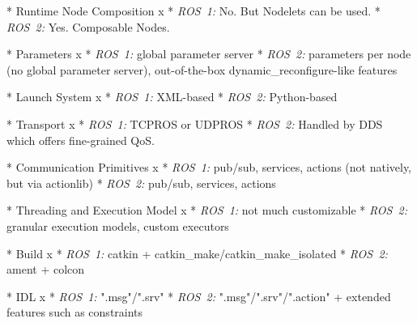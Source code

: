* Runtime Node Composition
\begitems \style x
* {\em ROS~1:} No. But Nodelets can be used.
* {\em ROS~2:} Yes. Composable Nodes.
\enditems

* Parameters
\begitems \style x
* {\em ROS~1:} global parameter server
* {\em ROS~2:} parameters per node (no global parameter server), out-of-the-box dynamic_reconfigure-like features
\enditems

* Launch System
\begitems \style x
* {\em ROS~1:} XML-based
* {\em ROS~2:} Python-based
\enditems

* Transport
\begitems \style x
* {\em ROS~1:} TCPROS or UDPROS
* {\em ROS~2:} Handled by DDS which offers fine-grained QoS.
\enditems

* Communication Primitives
\begitems \style x
* {\em ROS~1:} pub/sub, services, actions (not natively, but via actionlib)
* {\em ROS~2:} pub/sub, services, actions
\enditems

* Threading and Execution Model
\begitems \style x
* {\em ROS~1:} not much customizable
* {\em ROS~2:} granular execution models, custom executors
\enditems

* Build
\begitems \style x
* {\em ROS~1:} catkin + catkin_make/catkin_make_isolated
* {\em ROS~2:} ament + colcon
\enditems

* IDL
\begitems \style x
* {\em ROS~1:} ".msg"/".srv"
* {\em ROS~2:} ".msg"/".srv"/".action" + extended features such as constraints
\enditems

\enditems
